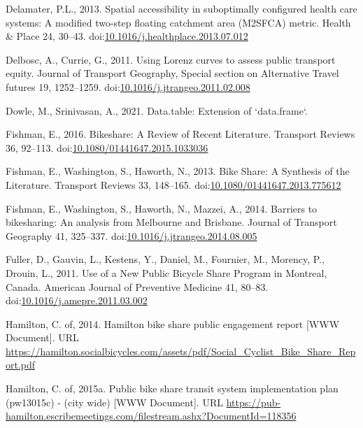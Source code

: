\documentclass[]{elsarticle} %
\begin{document}
\leavevmode\hypertarget{ref-delamaterSpatialAccessibilitySuboptimally2013}{}%
Delamater, P.L., 2013. Spatial accessibility in suboptimally configured
health care systems: A modified two-step floating catchment area
(M2SFCA) metric. Health \& Place 24, 30--43.
doi:\href{https://doi.org/10.1016/j.healthplace.2013.07.012}{10.1016/j.healthplace.2013.07.012}

\leavevmode\hypertarget{ref-delboscUsingLorenzCurves2011}{}%
Delbosc, A., Currie, G., 2011. Using Lorenz curves to assess public
transport equity. Journal of Transport Geography, Special section on
Alternative Travel futures 19, 1252--1259.
doi:\href{https://doi.org/10.1016/j.jtrangeo.2011.02.008}{10.1016/j.jtrangeo.2011.02.008}

\leavevmode\hypertarget{ref-R-data.table}{}%
Dowle, M., Srinivasan, A., 2021. Data.table: Extension of `data.frame`.

\leavevmode\hypertarget{ref-fishmanBikeshareReviewRecent2016}{}%
Fishman, E., 2016. Bikeshare: A Review of Recent Literature. Transport
Reviews 36, 92--113.
doi:\href{https://doi.org/10.1080/01441647.2015.1033036}{10.1080/01441647.2015.1033036}

\leavevmode\hypertarget{ref-fishmanBikeShareSynthesis2013}{}%
Fishman, E., Washington, S., Haworth, N., 2013. Bike Share: A Synthesis
of the Literature. Transport Reviews 33, 148--165.
doi:\href{https://doi.org/10.1080/01441647.2013.775612}{10.1080/01441647.2013.775612}

\leavevmode\hypertarget{ref-fishmanBarriersBikesharingAnalysis2014}{}%
Fishman, E., Washington, S., Haworth, N., Mazzei, A., 2014. Barriers to
bikesharing: An analysis from Melbourne and Brisbane. Journal of
Transport Geography 41, 325--337.
doi:\href{https://doi.org/10.1016/j.jtrangeo.2014.08.005}{10.1016/j.jtrangeo.2014.08.005}

\leavevmode\hypertarget{ref-fullerUseNewPublic2011}{}%
Fuller, D., Gauvin, L., Kestens, Y., Daniel, M., Fournier, M., Morency,
P., Drouin, L., 2011. Use of a New Public Bicycle Share Program in
Montreal, Canada. American Journal of Preventive Medicine 41, 80--83.
doi:\href{https://doi.org/10.1016/j.amepre.2011.03.002}{10.1016/j.amepre.2011.03.002}

\leavevmode\hypertarget{ref-hamiltonsobi2014}{}%
Hamilton, C. of, 2014. Hamilton bike share public engagement report
{[}WWW Document{]}. URL
\url{https://hamilton.socialbicycles.com/assets/pdf/Social_Cyclist_Bike_Share_Report.pdf}

\leavevmode\hypertarget{ref-hamiltonsobi2015}{}%
Hamilton, C. of, 2015a. Public bike share transit system implementation
plan (pw13015c) - (city wide) {[}WWW Document{]}. URL
\url{https://pub-hamilton.escribemeetings.com/filestream.ashx?DocumentId=118356}
\end{document}
